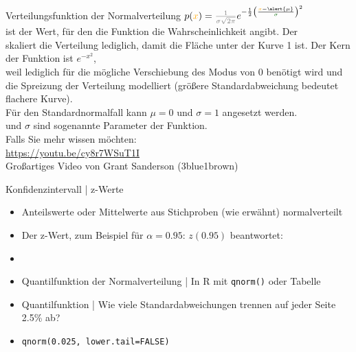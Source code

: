 \begin{frame}
  {Verteilungsfunktion der Normalverteilung}
  \onslide<+->
  \onslide<+->
  \centering 
  \LARGE
  \begin{math}
    p(\orongsch{x})=\grau{\frac{1}{\sigma\sqrt{2\pi}}}e^{-\frac{1}{2}\left(\frac{\orongsch{x}-\alert{\mu}}{\gruen{\sigma}}\right)^2}
  \end{math}\\
  \Zeile 
  \footnotesize {} ist der Wert, für den die Funktion die Wahrscheinlichkeit angibt. Der \\
  skaliert die Verteilung lediglich, damit die Fläche unter der Kurve 1 ist. Der Kern der Funktion ist $e^{-x^2}$,\\
  weil \blau{$-\mu$} lediglich für die mögliche Verschiebung des Modus von 0 benötigt wird und \gruen{$\sigma$}\\
  die Spreizung der Verteilung modelliert (größere Standardabweichung bedeutet flachere Kurve).\\
  Für den Standardnormalfall kann $\mu=0$ und $\sigma=1$ angesetzt werden.\\
  \gruen{$\mu$} und \alert{$\sigma$} sind sogenannte Parameter der Funktion.\\
  \Doppelzeile
  Falls Sie mehr wissen möchten:\\
  \Viertelzeile
  \url{https://youtu.be/cy8r7WSuT1I}\\
  \Viertelzeile
  Großartiges Video von Grant Sanderson (3blue1brown)
\end{frame}


\begin{frame}
  {Konfidenzintervall | z-Werte}
  \begin{itemize}[<+->]
    \item Anteilswerte oder Mittelwerte aus Stichproben (wie erwähnt) \alert{normalverteilt} 
    \item Der \alert{z-Wert}, zum Beispiel für $\alpha=0.95$: \alert{$z(0.95)$} beantwortet:\\
    \item {}
      \Zeile
    \item \alert{Quantilfunktion der Normalverteilung} | In R mit \alert{\texttt{qnorm()}} oder \alert{Tabelle}
    \item Quantilfunktion | Wie viele Standardabweichungen trennen auf jeder Seite 2.5\% ab?
    \item \alert{\texttt{qnorm(0.025, lower.tail=FALSE)}}  
  \end{itemize}
\end{frame}

